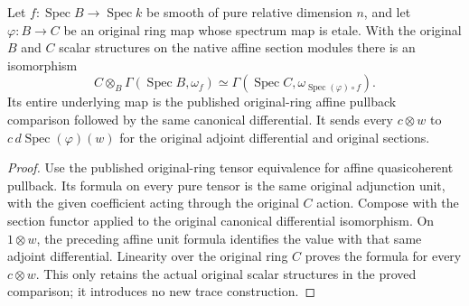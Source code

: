 \begin{lemma}
\label{lem:kn-global-trace-native-spectrum}
\leanok
{}
Let $f:\operatorname{Spec} B\to\operatorname{Spec} k$ be smooth of pure
relative dimension $n$, and let $\varphi:B\to C$ be an original ring map
whose spectrum map is etale.  With the original $B$ and $C$ scalar
structures on the native affine section modules there is an isomorphism
\[
 C\otimes_B\Gamma(\operatorname{Spec}B,\omega_f)
 \simeq\Gamma(\operatorname{Spec}C,\omega_{\operatorname{Spec}(\varphi)\circ f}).
\]
Its entire underlying map is the published original-ring affine pullback
comparison followed by the same canonical differential.  It sends every
$c\otimes w$ to $c\,d\operatorname{Spec}(\varphi)(w)$ for the original
adjoint differential and original sections.
\end{lemma}
\begin{proof}
Use the published original-ring tensor equivalence for affine quasicoherent
pullback.  Its formula on every pure tensor is the same original adjunction
unit, with the given coefficient acting through the original $C$ action.
Compose with the section functor applied to the original canonical
differential isomorphism.  On $1\otimes w$, the preceding affine unit
formula identifies the value with that same adjoint differential.  Linearity
over the original ring $C$ proves the formula for every $c\otimes w$.
This only retains the actual original scalar structures in the proved
comparison; it introduces no new trace construction.
\end{proof}

